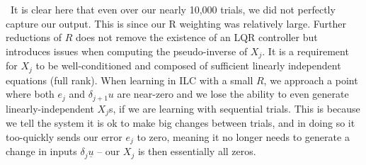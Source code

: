 \FloatBarrier~It is clear here that even over our nearly 10,000 trials, we did not perfectly capture our output. This is since our R weighting was relatively large. Further reductions of $R$ does not remove the existence of an LQR controller but introduces issues when computing the pseudo-inverse of $X_j$. 
It is a requirement for $X_j$ to be well-conditioned and composed of sufficient linearly independent equations (full rank). When learning in ILC with a small $R$, we approach a point where both $e_j$ and $\delta_{j+1}u$ are near-zero and we lose the ability to even generate linearly-independent $X_j$s, if we are learning with sequential trials. This is because we tell the system it is ok to make big changes between trials, and in doing so it too-quickly sends our error $e_j$ to zero, meaning it no longer needs to generate a change in inputs $\delta_j \underline{u}$ -- our $X_j$ is then essentially all zeros.

